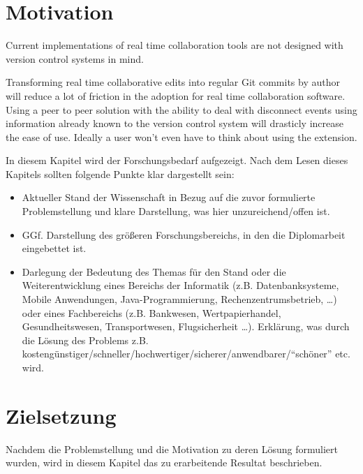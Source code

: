 \section{Motivation}

Current implementations of real time collaboration tools are not designed with version control systems in mind.

Transforming real time collaborative edits into regular Git commits by author will reduce a lot of friction in the adoption for real time collaboration software. Using a peer to peer solution with the ability to deal with disconnect events using information already known to the version control system will drasticly increase the ease of use. Ideally a user won't even have to think about using the extension.

In diesem Kapitel wird der Forschungsbedarf aufgezeigt. Nach dem Lesen dieses Kapitels sollten folgende Punkte klar dargestellt sein:
\begin{itemize}
	\item Aktueller Stand der Wissenschaft in Bezug auf die zuvor formulierte Problemstellung und klare Darstellung, was hier unzureichend/offen ist.
	\item GGf. Darstellung des größeren Forschungsbereichs, in den die Diplomarbeit eingebettet ist.
	\item Darlegung der Bedeutung des Themas für den Stand oder die Weiterentwicklung eines Bereichs der Informatik (z.B. Datenbanksysteme, Mobile Anwendungen, Java-Programmierung, Rechenzentrumsbetrieb, \dots) oder eines Fachbereichs (z.B. Bankwesen, Wertpapierhandel, Gesundheitswesen, Transportwesen, Flugsicherheit \dots). Erklärung, was durch die Lösung des Problems z.B. kostengünstiger/schneller/hochwertiger/sicherer/anwendbarer/\enquote{schöner} etc. wird.
\end{itemize}

\section{Zielsetzung}

Nachdem die Problemstellung und die Motivation zu deren Lösung formuliert wurden, wird in diesem Kapitel das zu erarbeitende Resultat beschrieben.

